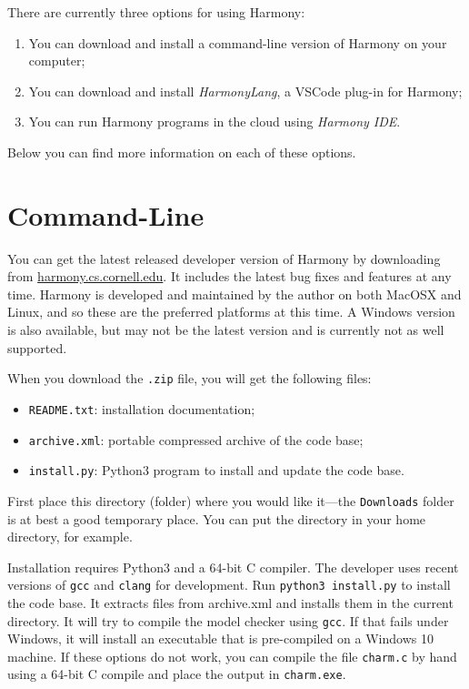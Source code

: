\documentclass{report}
\begin{document}
There are currently three options for using Harmony:

\begin{enumerate}
\item You can download and install a command-line version of Harmony on your
computer;
\item You can download and install \emph{HarmonyLang}, a VSCode plug-in for Harmony;
\item You can run Harmony programs in the cloud using \emph{Harmony IDE}.
\end{enumerate}

Below you can find more information on each of these options.

\section{Command-Line}

You can get the latest released developer version of Harmony by
downloading from \url{harmony.cs.cornell.edu}.  It includes the latest
bug fixes and features at any time.  Harmony is developed and maintained
by the author on both MacOSX and Linux, and so these are the preferred
platforms at this time.  A Windows version is also available, but may not
be the latest version and is currently not as well supported.

When you download the \texttt{.zip} file, you will get the following
files:

\begin{itemize}
\item \texttt{README.txt}: installation documentation;
\item \texttt{archive.xml}: portable compressed archive of the code base;
\item \texttt{install.py}: Python3 program to install and update the code base.
\end{itemize}

First place this directory (folder) where you would like it---the
\texttt{Downloads} folder is at best a good temporary place.  You can put
the directory in your home directory, for example.

Installation requires Python3 and a 64-bit C compiler.  The developer uses
recent versions of \texttt{gcc} and \texttt{clang} for development.
Run \texttt{python3 install.py} to install the code base.
It extracts files from archive.xml and installs them in the current
directory.
It will try to compile the model checker using \texttt{gcc}.
If that fails under Windows, it will install an executable that
is pre-compiled on a Windows 10 machine.  If these options do not work,
you can compile the file \texttt{charm.c} by hand using a 64-bit C
compile and place the output in \texttt{charm.exe}.
\end{document}
